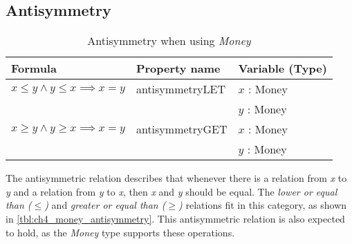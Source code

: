 \subsection*{Antisymmetry}
\label{ssct:properties_antisymmetry}
\begin{table}[!ht]
\centering
\begin{tabular}{lll}
\hline
                        \textbf{Formula}                              & \textbf{Property name} & \textbf{Variable (Type)} \\ \hline
\rowcolor[HTML]{EFEFEF} $x \leq y \land y \leq x \implies x = y$ & antisymmetryLET        & $x$ : Money              \\
\rowcolor[HTML]{EFEFEF}                                               &                        & $y$ : Money              \\
                        $x \geq y \land y \geq x \implies x = y$ & antisymmetryGET        & $x$ : Money              \\
                                                                      &                        & $y$ : Money              \\ \hline
\end{tabular}
\caption{Antisymmetry when using \textit{Money}}
\label{tbl:ch4_money_antisymmetry}
\end{table}
\FloatBarrier\noindent
The antisymmetric relation describes that whenever there is a relation from
\textit{x} to \textit{y} and a relation from \textit{y} to \textit{x}, then
\textit{x} and \textit{y} should be equal. The
\textit{lower or equal than ($\leq$)} and
\textit{greater or equal than ($\geq$)} relations fit in this category, as shown
in \autoref{tbl:ch4_money_antisymmetry}. This antisymmetric relation is also
expected to hold, as the \textit{Money} type supports these operations.
\clearpage %
